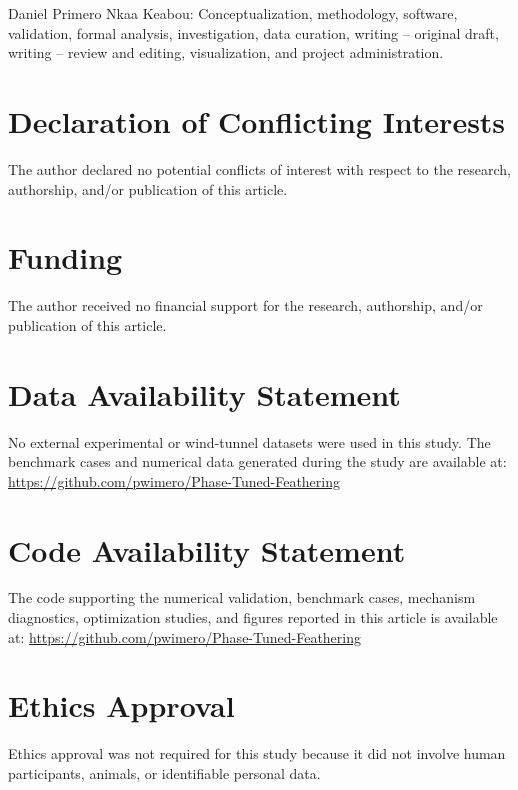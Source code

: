 \documentclass[11pt]{article}
\begin{document}
Daniel Primero Nkaa Keabou: Conceptualization, methodology, software, validation, formal analysis, investigation, data curation, writing -- original draft, writing -- review and editing, visualization, and project administration.

\section{Declaration of Conflicting Interests}

The author declared no potential conflicts of interest with respect to the research, authorship, and/or publication of this article.

\section{Funding}

The author received no financial support for the research, authorship, and/or publication of this article.

\section{Data Availability Statement}

No external experimental or wind-tunnel datasets were used in this study. The benchmark cases and numerical data generated during the study are available at: \url{https://github.com/pwimero/Phase-Tuned-Feathering}

\section{Code Availability Statement}

The code supporting the numerical validation, benchmark cases, mechanism diagnostics, optimization studies, and figures reported in this article is available at: \url{https://github.com/pwimero/Phase-Tuned-Feathering}

\section{Ethics Approval}

Ethics approval was not required for this study because it did not involve human participants, animals, or identifiable personal data.
\end{document}
